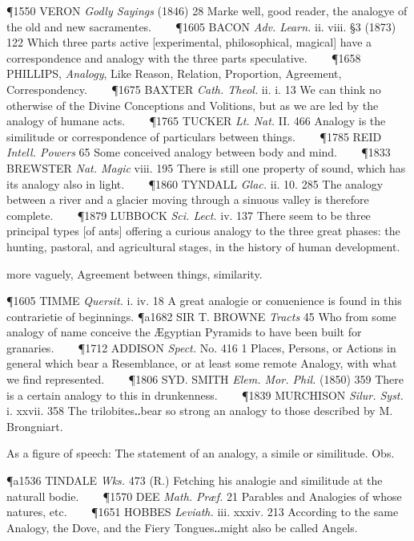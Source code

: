 \begin{description}[wide, labelwidth=!, labelindent=0pt]
\begin{myenumerate}
\P 1550 VERON \textit{Godly Sayings} (1846) 28 Marke well, good reader, the analogye of the old and new sacramentes.    
\P 1605 BACON \textit{Adv. Learn.} ii. viii. §3 (1873) 122 Which three parts active [experimental, philosophical, magical] have a correspondence and analogy with the three parts speculative.    
\P 1658 PHILLIPS, \textit{Analogy}, Like Reason, Relation, Proportion, Agreement, Correspondency.    
\P 1675 BAXTER \textit{Cath. Theol.} ii. i. 13 We can think no otherwise of the Divine Conceptions and Volitions, but as we are led by the analogy of humane acts.    
\P 1765 TUCKER \textit{Lt. Nat.} II. 466 Analogy is the similitude or correspondence of particulars between things.    
\P 1785 REID \textit{Intell. Powers} 65 Some conceived analogy between body and mind.    
\P 1833 BREWSTER \textit{Nat. Magic} viii. 195 There is still one property of sound, which has its analogy also in light.    
\P 1860 TYNDALL \textit{Glac.} ii. 10. 285 The analogy between a river and a glacier moving through a sinuous valley is therefore complete.    
\P 1879 LUBBOCK \textit{Sci. Lect.} iv. 137 There seem to be three principal types [of ants] offering a curious analogy to the three great phases: the hunting, pastoral, and agricultural stages, in the history of human development.

 more vaguely, Agreement between things, similarity. 

\P 1605 TIMME \textit{Quersit.} i. iv. 18 A great analogie or conuenience is found in this contrarietie of beginnings.
\P a1682 SIR T. BROWNE \textit{Tracts} 45 Who from some analogy of name conceive the Ægyptian Pyramids to have been built for granaries.    
\P 1712 ADDISON \textit{Spect.} No. 416 1 Places, Persons, or Actions in general which bear a Resemblance, or at least some remote Analogy, with what we find represented.    
\P 1806 SYD. SMITH \textit{Elem. Mor. Phil.} (1850) 359 There is a certain analogy to this in drunkenness.    
\P 1839 MURCHISON \textit{Silur. Syst.} i. xxvii. 358 The trilobites‥bear so strong an analogy to those described by M. Brongniart.

 As a figure of speech: The statement of an analogy, a simile or similitude. Obs. 

\P a1536 TINDALE \textit{Wks.} 473 (R.) Fetching his analogie and similitude at the naturall bodie.    
\P 1570 DEE \textit{Math. Præf.} 21 Parables and Analogies of whose natures, etc.    
\P 1651 HOBBES \textit{Leviath.} iii. xxxiv. 213 According to the same Analogy, the Dove, and the Fiery Tongues‥might also be called Angels.


\end{myenumerate}
\end{description}
